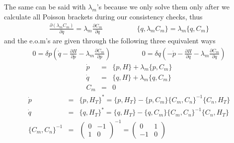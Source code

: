 \documentclass[aps,preprint,preprintnumbers,nofootinbib,showpacs,prd]{revtex4-1}
\newcommand{\nbea}{\begin{eqnarray*}}
\newcommand{\neea}{\end{eqnarray*}}
\begin{document}
The same can be said with $\lambda_m$'s because we only solve them only after we calculate all Poisson brackets during our consistency checks, thus
%
\nbea
\frac{\partial (\lambda_m C_m)}{\partial q} = \lambda_m\frac{\partial C_m}{\partial q} &~~~~~~~~~~~~~~~& \{q, \lambda_m C_m\} = \lambda_m \{q, C_m\}
\neea
%
and the e.o.m's are given through the following three equivalent ways
%
\nbea
0 = \delta p \left ( \dot q  - \frac{\partial H}{\partial p} - \lambda_m \frac{\partial C_m}{\partial p} \right ) &~~~~~~~~~~~~~& 0 = \delta q \left ( - \dot p - \frac{\partial H}{\partial q} - \lambda_m\frac{\partial C_m}{\partial q}\right )
\neea
%
%
\nbea
\dot p & = & \{p, H\} + \lambda_m\{p, C_m\} \\
\dot q & = & \{q, H\} + \lambda_m\{q, C_m\} \\
C_m & = & 0
\neea
%
%
\nbea
\dot p & = & \{p, H_T\}^* = \{p, H_T\} - \{p, C_m\}\{C_m, C_n\}^{-1}\{C_n, H_T\} \\
\dot q & = & \{q, H_T\}^* = \{q, H_T\} - \{q, C_m\}\{C_m, C_n\}^{-1}\{C_n, H_T\} \\
\{C_m, C_n\}^{-1} & = & \left ( \begin{array}{cc}
0 & -1 \\
1 & 0
\end{array} \right )^{-1} = \left ( \begin{array}{cc}
0 & 1 \\
-1 & 0
\end{array} \right )
\neea
%
\end{document}
